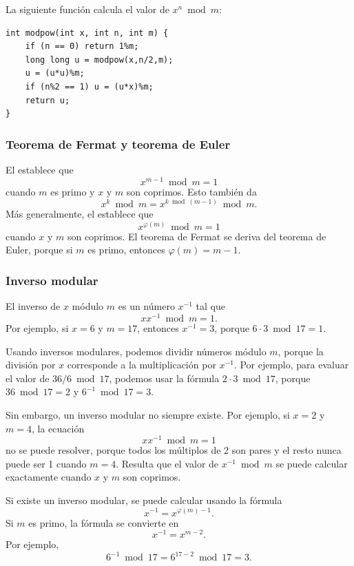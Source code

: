La siguiente función calcula el valor de
$x^n \bmod m$:

\begin{lstlisting}
int modpow(int x, int n, int m) {
    if (n == 0) return 1%m;
    long long u = modpow(x,n/2,m);
    u = (u*u)%m;
    if (n%2 == 1) u = (u*x)%m;
    return u;
}
\end{lstlisting}

\subsubsection{Teorema de Fermat y teorema de Euler}


El 
establece que
\[x^{m-1} \bmod m = 1\]
cuando $m$ es primo y $x$ y $m$ son coprimos.
Esto también da
\[x^k \bmod m = x^{k \bmod (m-1)} \bmod m.\]
Más generalmente, el 
establece que
\[x^{\varphi(m)} \bmod m = 1\]
cuando $x$ y $m$ son coprimos.
El teorema de Fermat se deriva del teorema de Euler,
porque si $m$ es primo, entonces $\varphi(m)=m-1$.

\subsubsection{Inverso modular}


El inverso de $x$ módulo $m$
es un número $x^{-1}$ tal que
\[ x x^{-1} \bmod m = 1. \]
Por ejemplo, si $x=6$ y $m=17$,
entonces $x^{-1}=3$, porque $6\cdot3 \bmod 17=1$.

Usando inversos modulares, podemos dividir números
módulo $m$, porque la división por $x$
corresponde a la multiplicación por $x^{-1}$.
Por ejemplo, para evaluar el valor de $36/6 \bmod 17$,
podemos usar la fórmula $2 \cdot 3 \bmod 17$,
porque $36 \bmod 17 = 2$ y $6^{-1} \bmod 17 = 3$.

Sin embargo, un inverso modular no siempre existe.
Por ejemplo, si $x=2$ y $m=4$, la ecuación
\[ x x^{-1} \bmod m = 1 \]
no se puede resolver, porque todos los múltiplos de 2
son pares y el resto nunca puede ser 1 cuando $m=4$.
Resulta que el valor de $x^{-1} \bmod m$
se puede calcular exactamente cuando $x$ y $m$ son coprimos.

Si existe un inverso modular, se puede
calcular usando la fórmula
\[
x^{-1} = x^{\varphi(m)-1}.
\]
Si $m$ es primo, la fórmula se convierte en
\[
x^{-1} = x^{m-2}.
\]
Por ejemplo,
\[6^{-1} \bmod 17 =6^{17-2} \bmod 17 = 3.\]

